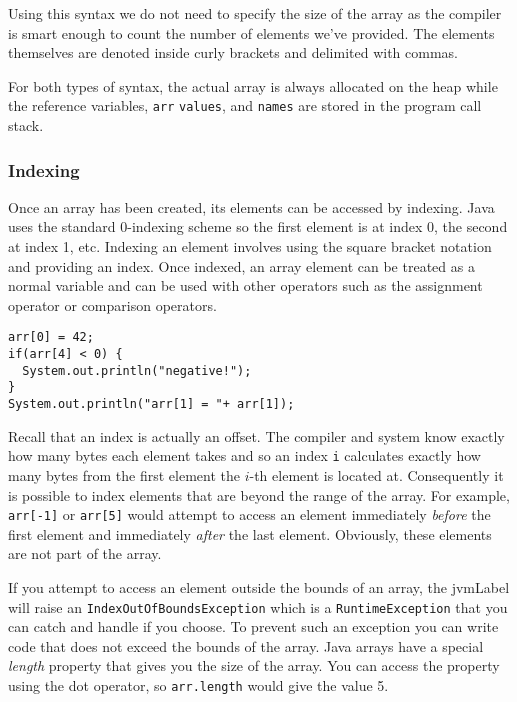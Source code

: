 Using this syntax we do not need to specify the size of the array 
as the compiler is smart enough to count the number of elements
we've provided.  The elements themselves are denoted inside curly
brackets and delimited with commas.  

For both types of syntax, the actual array is always allocated on the heap
while the reference variables, \texttt{arr} \texttt{values}, 
and \texttt{names} are stored in the program call stack.

\subsubsection{Indexing}

Once an array has been created, its elements can be accessed
by indexing.  Java uses the standard 0-indexing scheme so the
first element is at index 0, the second at index 1, etc.  Indexing
an element involves using the square bracket notation and
providing an index.  Once indexed, an array element can be
treated as a normal variable and can be used with other operators
such as the assignment operator or comparison operators.

\begin{verbatim}
arr[0] = 42;
if(arr[4] < 0) {
  System.out.println("negative!");
}
System.out.println("arr[1] = "+ arr[1]);
\end{verbatim}

Recall that an index is actually an offset.  The compiler and
system know exactly how many bytes each 
element takes and so an index \texttt{i} calculates
exactly how many bytes from the first element the $i$-th
element is located at.  Consequently it is possible to index
elements that are beyond the range of the array.  For example, 
\texttt{arr[-1]} or \texttt{arr[5]} would attempt
to access an element immediately \emph{before} the first element
and immediately \emph{after} the last element.  Obviously, 
these elements are not part of the array.  

If you attempt to access an element outside the bounds of
an array, the \gls{jvmLabel} will raise an \texttt{IndexOutOfBoundsException}
which is a \texttt{RuntimeException} that you can
catch and handle if you choose.  To prevent such an exception
you can write code that does not exceed the bounds of the
array.  Java arrays have a special \emph{length} property that
gives you the size of the array.  You can access the property
using the dot operator, so \texttt{arr.length} would
give the value 5.  

